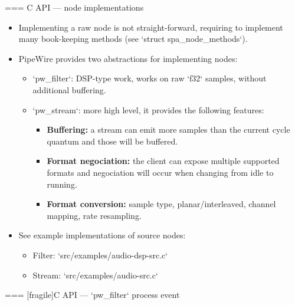 === {C API — node implementations}
  \begin{itemize}

  \item Implementing a raw node is not straight-forward, requiring to
    implement many book-keeping methods (see `struct spa_node_methods`).

  \item PipeWire provides two abstractions for implementing nodes:

    \begin{itemize}

    \item `pw_filter`: DSP-type work, works on raw `f32`
      samples, without additional buffering.

    \item `pw_stream`: more high level, it provides the following
      features:
      \begin{itemize}
      \item \textbf{Buffering:} a stream can emit more samples than
        the current cycle quantum and those will be buffered.
      \item \textbf{Format negociation:} the client can expose multiple
        supported formats and negociation will occur when changing from
        idle to running.
      \item \textbf{Format conversion:} sample type, planar/interleaved,
        channel mapping, rate resampling.
      \end{itemize}

    \end{itemize}

  \item See example implementations of source nodes:
    \begin{itemize}
    \item Filter: `src/examples/audio-dsp-src.c`
    \item Stream: `src/examples/audio-src.c`
    \end{itemize}

  \end{itemize}




=== [fragile]{C API — `pw_filter` process event}
  
